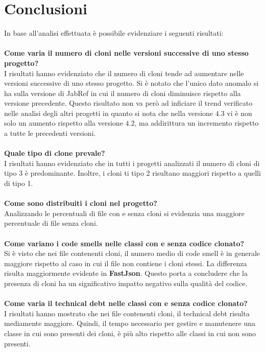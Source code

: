 \chapter{Conclusioni}\label{cap5}
In base all'analisi effettuata è possibile evidenziare i seguenti risultati: \\ \\
\textbf{Come varia il numero di cloni nelle versioni successive di uno stesso progetto?}\\ 
I risultati hanno evidenziato che il numero di cloni tende ad aumentare nelle versioni successive di uno stesso progetto. Si è notato che l'unico dato anomalo si ha sulla versione di JabRef in cui il numero di cloni diminuisce rispetto alla versione precedente. Questo risultato non va però ad inficiare il trend verificato nelle analisi degli altri progetti in quanto si nota che nella versione $4.3$ vi è non solo un aumento rispetto alla versione $4.2$, ma addirittura un incremento rispetto a tutte le precedenti versioni. \\ \\
\textbf{Quale tipo di clone prevale?}\\
I risultati hanno evidenziato che in tutti i progetti analizzati il numero di cloni di tipo 3 è predominante. Inoltre, i cloni ti tipo 2 risultano maggiori rispetto a quelli di tipo 1.\\ \\
\textbf{Come sono distribuiti i cloni nel progetto?}\\ 
Analizzando le percentuali di file con e senza cloni si evidenzia una maggiore percentuale di file senza cloni. \\ \\
\textbf{Come variano i code smells nelle classi con e senza codice clonato?}\\
Si è visto che nei file contenenti cloni, il numero medio di code smell è in generale maggiore rispetto al caso in cui il file non contiene i cloni stessi. La differenza risulta maggiormente evidente in \textbf{FastJson}. Questo porta a concludere che la presenza di cloni ha un significativo impatto negativo sulla qualità del codice. \\ \\
\textbf{Come varia il technical debt nelle classi con e senza codice clonato?}\\
I risultati hanno mostrato che nei file contenenti cloni, il technical debt risulta mediamente maggiore. Quindi, il tempo necessario per gestire e manutenere una classe in cui sono presenti dei cloni, è più alto rispetto alle classi in cui non sono presenti. \newpage

